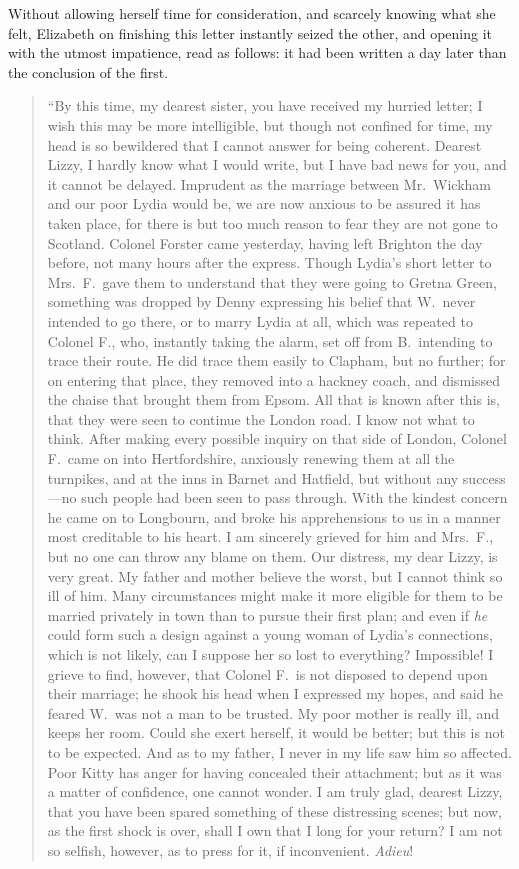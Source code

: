 \documentclass[12pt,english]{book}
\begin{document}
Without allowing herself time for consideration, and scarcely knowing
what she felt, Elizabeth on finishing this letter instantly seized
the other, and opening it with the utmost impatience, read as follows:
it had been written a day later than the conclusion of the first.

\begin{quotation}{}``By this time, my dearest sister, you have received
my hurried letter; I wish this may be more intelligible, but though
not confined for time, my head is so bewildered that I cannot answer
for being coherent. Dearest Lizzy, I hardly know what I would write,
but I have bad news for you, and it cannot be delayed. Imprudent as
the marriage between Mr.\ Wickham and our poor Lydia would be, we
are now anxious to be assured it has taken place, for there is but
too much reason to fear they are not gone to Scotland. Colonel Forster
came yesterday, having left Brighton the day before, not many hours
after the express. Though Lydia's short letter to Mrs.\ F.\ gave
them to understand that they were going to Gretna Green, something
was dropped by Denny expressing his belief that W.\ never intended
to go there, or to marry Lydia at all, which was repeated to Colonel
F., who, instantly taking the alarm, set off from B.\ intending to
trace their route. He did trace them easily to Clapham, but no further;
for on entering that place, they removed into a hackney coach, and
dismissed the chaise that brought them from Epsom. All that is known
after this is, that they were seen to continue the London road. I
know not what to think. After making every possible inquiry on that
side of London, Colonel F.\ came on into Hertfordshire, anxiously
renewing them at all the turnpikes, and at the inns in Barnet and
Hatfield, but without any success\mbox{---}no such people had been
seen to pass through. With the kindest concern he came on to Longbourn,
and broke his apprehensions to us in a manner most creditable to his
heart. I am sincerely grieved for him and Mrs.\ F., but no one can
throw any blame on them. Our distress, my dear Lizzy, is very great.
My father and mother believe the worst, but I cannot think so ill
of him. Many circumstances might make it more eligible for them to
be married privately in town than to pursue their first plan; and
even if \textit{he} could form such a design against a young woman
of Lydia's connections, which is not likely, can I suppose her so
lost to everything? Impossible! I grieve to find, however, that Colonel
F.\ is not disposed to depend upon their marriage; he shook his head
when I expressed my hopes, and said he feared W.\ was not a man to
be trusted. My poor mother is really ill, and keeps her room. Could
she exert herself, it would be better; but this is not to be expected.
And as to my father, I never in my life saw him so affected. Poor
Kitty has anger for having concealed their attachment; but as it was
a matter of confidence, one cannot wonder. I am truly glad, dearest
Lizzy, that you have been spared something of these distressing scenes;
but now, as the first shock is over, shall I own that I long for your
return? I am not so selfish, however, as to press for it, if inconvenient.
\emph{Adieu}! 


\end{quotation}
\end{document}

